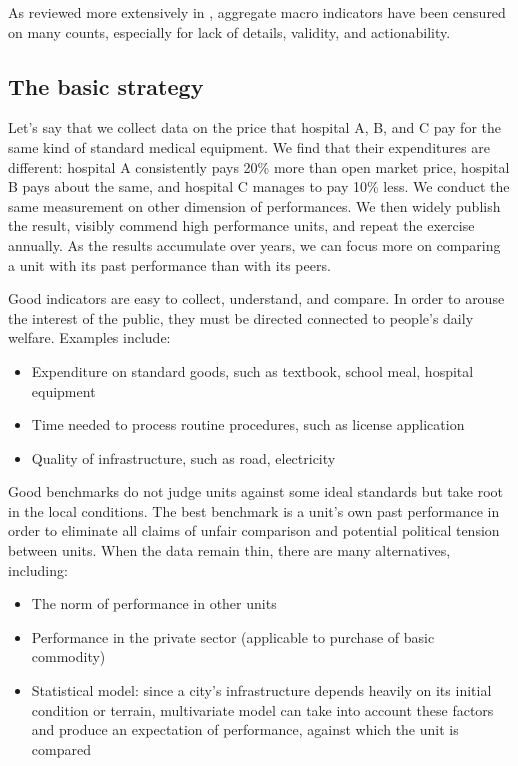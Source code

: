 \documentclass[12pt]{article}
\begin{document}
As reviewed more extensively in \citet{Pande2013}, aggregate macro indicators have been censured on many counts, especially for lack of details, validity, and actionability.

\subsection{The basic strategy}
\label{sec:strategy}

Let's say that we collect data on the price that hospital A, B, and C pay for the same kind of standard medical equipment. We find that their expenditures are different: hospital A consistently pays 20\% more than open market price, hospital B pays about the same, and hospital C manages to pay 10\% less. We conduct the same measurement on other dimension of performances. We then widely publish the result, visibly commend high performance units, and repeat the exercise annually. As the results accumulate over years, we can focus more on comparing a unit with its past performance than with its peers.

Good indicators are easy to collect, understand, and compare. In order to arouse the interest of the public, they must be directed connected to people's daily welfare. Examples include:
\begin{itemize}[noitemsep]
\item{Expenditure on standard goods, such as textbook, school meal, hospital equipment}
\item{Time needed to process routine procedures, such as license application}
\item{Quality of infrastructure, such as road, electricity}
\end{itemize}

Good benchmarks do not judge units against some ideal standards but take root in the local conditions. The best benchmark is a unit's own past performance in order to eliminate all claims of unfair comparison and potential political tension between units. When the data remain thin, there are many alternatives, including:
\begin{itemize}[noitemsep]
\item{The norm of performance in other units}
\item{Performance in the private sector (applicable to purchase of basic commodity)}
\item{Statistical model: since a city's infrastructure depends heavily on its initial condition or terrain, multivariate model can take into account these factors and produce an expectation of performance, against which the unit is compared}
\end{itemize}
\end{document}
